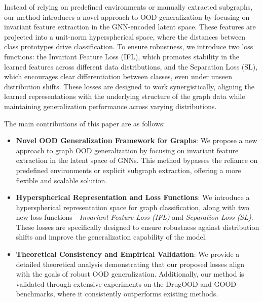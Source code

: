 Instead of relying on predefined environments or manually extracted subgraphs, our method introduces a novel approach to OOD generalization by focusing on invariant feature extraction in the GNN-encoded latent space. These features are projected into a unit-norm hyperspherical space, where the distances between class prototypes drive classification. To ensure robustness, we introduce two loss functions: the Invariant Feature Loss (IFL), which promotes stability in the learned features across different data distributions, and the Separation Loss (SL), which encourages clear differentiation between classes, even under unseen distribution shifts. These losses are designed to work synergistically, aligning the learned representations with the underlying structure of the graph data while maintaining generalization performance across varying distributions.


The main contributions of this paper are as follows:

\begin{itemize}[leftmargin=*]
    \item \textbf{Novel OOD Generalization Framework for Graphs}: We propose a new approach to graph OOD generalization by focusing on invariant feature extraction in the latent space of GNNs. This method bypasses the reliance on predefined environments or explicit subgraph extraction, offering a more flexible and scalable solution.
    
    \item \textbf{Hyperspherical Representation and Loss Functions}: We introduce a hyperspherical representation space for graph classification, along with two new loss functions—\textit{Invariant Feature Loss (IFL)} and \textit{Separation Loss (SL)}. These losses are specifically designed to ensure robustness against distribution shifts and improve the generalization capability of the model.
    
    \item \textbf{Theoretical Consistency and Empirical Validation}: We provide a detailed theoretical analysis demonstrating that our proposed losses align with the goals of robust OOD generalization. Additionally, our method is validated through extensive experiments on the DrugOOD and GOOD benchmarks, where it consistently outperforms existing methods.
\end{itemize}




